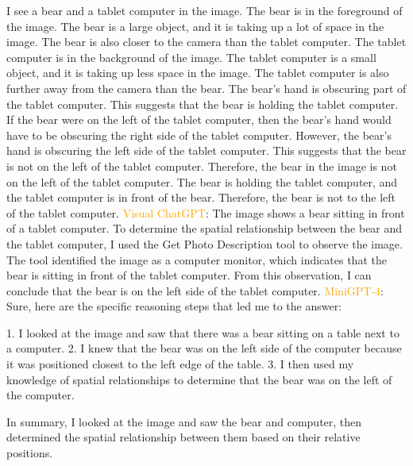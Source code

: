 \begin{enumerate}
    I see a bear and a tablet computer in the image.
    The bear is in the foreground of the image. The bear is a large object, and it is taking up a lot of space in the image. The bear is also closer to the camera than the tablet computer.
    The tablet computer is in the background of the image. The tablet computer is a small object, and it is taking up less space in the image. The tablet computer is also further away from the camera than the bear.
    The bear's hand is obscuring part of the tablet computer. This suggests that the bear is holding the tablet computer.
    If the bear were on the left of the tablet computer, then the bear's hand would have to be obscuring the right side of the tablet computer. However, the bear's hand is obscuring the left side of the tablet computer. This suggests that the bear is not on the left of the tablet computer.
    Therefore, the bear in the image is not on the left of the tablet computer. The bear is holding the tablet computer, and the tablet computer is in front of the bear. Therefore, the bear is not to the left of the tablet computer.
    \subitem \textcolor{orange}{Visual ChatGPT}: The image shows a bear sitting in front of a tablet computer. To determine the spatial relationship between the bear and the tablet computer, I used the Get Photo Description tool to observe the image. The tool identified the image as a computer monitor, which indicates that the bear is sitting in front of the tablet computer. From this observation, I can conclude that the bear is on the left side of the tablet computer.
    \subitem \textcolor{orange}{MiniGPT-4}: Sure, here are the specific reasoning steps that led me to the answer:

    1. I looked at the image and saw that there was a bear sitting on a table next to a computer.
    2. I knew that the bear was on the left side of the computer because it was positioned closest to the left edge of the table.
    3. I then used my knowledge of spatial relationships to determine that the bear was on the left of the computer.
    
    In summary, I looked at the image and saw the bear and computer, then determined the spatial relationship between them based on their relative positions.
\end{enumerate}
